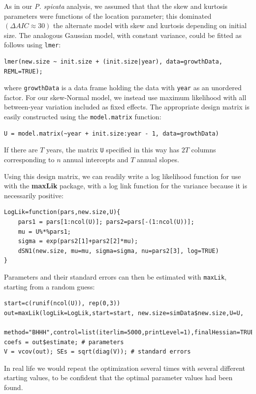 \documentclass[12pt]{article}
\begin{document}
As in our \emph{P. spicata} analysis, we assumed that that the skew and kurtosis parameters were functions
of the location parameter; this dominated $(\Delta AIC \approx 30)$ the alternate 
model with skew and kurtosis depending on initial size.   
The analogous Gaussian model, with constant variance, could be fitted as follows using \texttt{lmer}:
\begin{lstlisting}
lmer(new.size ~ init.size + (init.size|year), data=growthData, REML=TRUE); 
\end{lstlisting}
where \texttt{growthData} is a data frame holding the data with \texttt{year} as an unordered factor. For our skew-Normal
model, we instead use maximum likelihood with all between-year variation included as fixed effects. The appropriate design
matrix is easily constructed using the \texttt{model.matrix} function: 
\begin{lstlisting}
U = model.matrix(~year + init.size:year - 1, data=growthData)
\end{lstlisting}
If there are $T$ years, the matrix \texttt{U} specified in this way has $2T$ columns corresponding to $n$ annual 
intercepts and $T$ annual slopes. 

Using this design matrix, we can readily write a log likelihood function for use with 
the \textbf{maxLik} package, with a log link function for the variance because it is necessarily positive: 
\begin{lstlisting}
LogLik=function(pars,new.size,U){
    pars1 = pars[1:ncol(U)]; pars2=pars[-(1:ncol(U))];
    mu = U%*%pars1;  
    sigma = exp(pars2[1]+pars2[2]*mu);
    dSN1(new.size, mu=mu, sigma=sigma, nu=pars2[3], log=TRUE)
}
\end{lstlisting} 

Parameters and their standard errors can then be estimated with \texttt{maxLik}, 
starting from a random guess: 
\begin{lstlisting}
start=c(runif(ncol(U)), rep(0,3))
out=maxLik(logLik=LogLik,start=start, new.size=simData$new.size,U=U,
  method="BHHH",control=list(iterlim=5000,printLevel=1),finalHessian=TRUE);
coefs = out$estimate; # parameters
V = vcov(out); SEs = sqrt(diag(V));	# standard errors 
\end{lstlisting}  
In real life we would repeat the optimization several times with several different starting values, to be confident that
the optimal parameter values had been found. 
\end{document}

